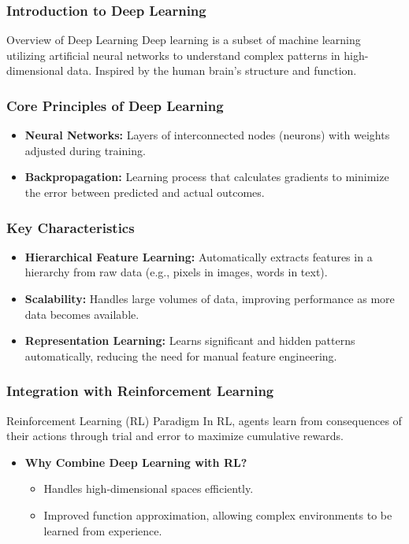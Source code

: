 \documentclass[aspectratio=169]{beamer}
\begin{document}
\begin{frame}[fragile]
    \frametitle{Introduction to Deep Learning}
    \begin{block}{Overview of Deep Learning}
        Deep learning is a subset of machine learning utilizing artificial neural networks to understand complex patterns in high-dimensional data. Inspired by the human brain's structure and function.
    \end{block}
\end{frame}

\begin{frame}[fragile]
    \frametitle{Core Principles of Deep Learning}
    \begin{itemize}
        \item \textbf{Neural Networks:} Layers of interconnected nodes (neurons) with weights adjusted during training.
        \item \textbf{Backpropagation:} Learning process that calculates gradients to minimize the error between predicted and actual outcomes.
    \end{itemize}
\end{frame}

\begin{frame}[fragile]
    \frametitle{Key Characteristics}
    \begin{itemize}
        \item \textbf{Hierarchical Feature Learning:} Automatically extracts features in a hierarchy from raw data (e.g., pixels in images, words in text).
        \item \textbf{Scalability:} Handles large volumes of data, improving performance as more data becomes available.
        \item \textbf{Representation Learning:} Learns significant and hidden patterns automatically, reducing the need for manual feature engineering.
    \end{itemize}
\end{frame}

\begin{frame}[fragile]
    \frametitle{Integration with Reinforcement Learning}
    \begin{block}{Reinforcement Learning (RL) Paradigm}
        In RL, agents learn from consequences of their actions through trial and error to maximize cumulative rewards.
    \end{block}
    
    \begin{itemize}
        \item \textbf{Why Combine Deep Learning with RL?}
            \begin{itemize}
                \item Handles high-dimensional spaces efficiently.
                \item Improved function approximation, allowing complex environments to be learned from experience.
            \end{itemize}
    \end{itemize}
\end{frame}
\end{document}
